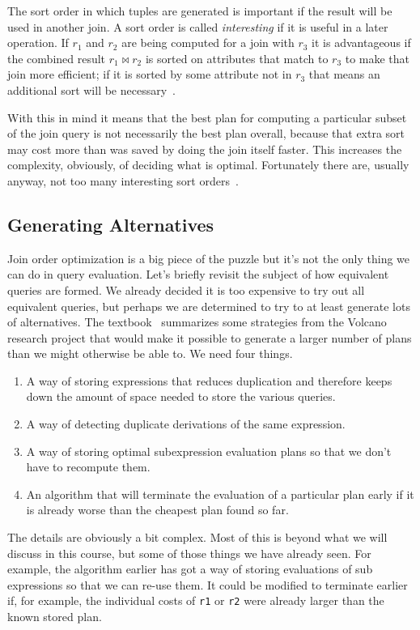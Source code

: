 The sort order in which tuples are generated is important if the result will be used in another join. A sort order is called \textit{interesting} if it is useful in a later operation. If $r_{1}$ and $r_{2}$ are being computed for a join with $r_{3}$ it is advantageous if the combined result $r_{1} \bowtie r_{2}$ is sorted on attributes that match to $r_{3}$ to make that join more efficient; if it is sorted by some attribute not in $r_{3}$ that means an additional sort will be necessary~\cite{dsc}.

With this in mind it means that the best plan for computing a particular subset of the join query is not necessarily the best plan overall, because that extra sort may cost more than was saved by doing the join itself faster. This increases the complexity, obviously, of deciding what is optimal. Fortunately there are, usually anyway, not too many interesting sort orders~\cite{dsc}. 

\subsection*{Generating Alternatives}

Join order optimization is a big piece of the puzzle but it's not the only thing we can do in query evaluation. Let's briefly revisit the subject of how equivalent queries are formed. We already decided it is too expensive to try out all equivalent queries, but perhaps we are determined to try to at least generate lots of alternatives. The textbook~\cite{dsc} summarizes some strategies from the Volcano research project that would make it possible to generate a larger number of plans than we might otherwise be able to. We need four things.

\begin{enumerate}
	\item A way of storing expressions that reduces duplication and therefore keeps down the amount of space needed to store the various queries.
	\item A way of detecting duplicate derivations of the same expression.
	\item A way of storing optimal subexpression evaluation plans so that we don't have to recompute them.
	\item An algorithm that will terminate the evaluation of a particular plan early if it is already worse than the cheapest plan found so far.
\end{enumerate}

The details are obviously a bit complex. Most of this is beyond what we will discuss in this course, but some of those things we have already seen. For example, the algorithm earlier has got a way of storing evaluations of sub expressions so that we can re-use them. It could be modified to terminate earlier if, for example, the individual costs of \texttt{r1} or \texttt{r2} were already larger than the known stored plan.


